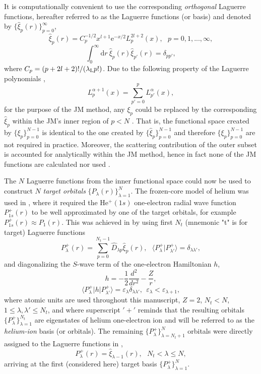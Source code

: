 \documentclass[aip
, pra
, showpacs
, aps
, twocolumn
, groupedaddress
, floatfix
]{revtex4}
\newcommand{\beq}{\begin{equation}}
\newcommand{\eeq}{\end{equation}}
\begin{document}
It is computationally convenient to use the corresponding {\em orthogonal} Laguerre functions,
hereafter referred to as the Laguerre functions (or basis) and denoted by $\{\hat{\xi}_p(r)\}_{p=0}^\infty$,
\[
\hat{\xi}_p(r) = C_p^{-1/2} x^{l+1} \mbox{e}^{-x /2}
L_p^{2l+2}(x), \ \ \ p = 0, 1, ..., \infty,
\]
\[
\int_0^{\infty} \mbox{d}r \ \hat{\xi}_p(r) \hat{\xi}_{p'}(r)=\delta_{pp'},
\]
where $C_p=(p+2l+2)!/(\lambda_{\rm L} p!)$.
Due to the following property of the Laguerre polynomials \cite{abramowitz},
\[
L_p^{\alpha + 1}(x)=\sum_{p'=0}^{p}L_{p'}^{\alpha}(x),
\]
for the purpose of the JM method, any $\xi_p$ could be replaced by the corresponding $\hat{\xi}_p$
within the JM's inner region of $p < N$ \cite{KB10p022708, KFB11}.
That is, the functional space created by $\{\xi_p\}_{p=0}^{N-1}$ is identical
to the one created by $\{\hat{\xi}_p\}_{p=0}^{N-1}$ and therefore $\{\xi_p\}_{p=0}^{N-1}$ are not required
in practice. Moreover, the scattering contribution of the outer subset is accounted for analytically within the JM method,
hence in fact none of the JM functions are calculated nor used \cite{KB10p022708, KFB11}.


The $N$  Laguerre functions from the inner functional space could now be used to construct $N$ {\em target orbitals}
$\{P_\lambda(r)\}_{\lambda=1}^{N}$.
The frozen-core model of helium was used in \cite{KFB11}, where it required the He$^+(1s)$ one-electron radial wave function
$P^+_{1s}(r)$ to be well approximated by one of the target orbitals, for example $P^+_{1s}(r) \approx P_1(r)$.
This was achieved in \cite{KFB11} by using first $N_t$ (mnemonic "t" is for target) Laguerre functions
\beq
P^+_\lambda(r)=\sum_{p=0}^{N_t-1} \hat{D}_{\lambda p} \hat{\xi}_p(r),
\ \ \ \langle P^+_\lambda|P^+_{\lambda'}\rangle=\delta_{\lambda\lambda'},
\label{P_ion_sum} \eeq
and diagonalizing the $S$-wave term of the one-electron Hamiltonian $h$,
\beq
h = -\frac{1}{2} \frac{d^2} {dr^2} - \frac{Z}{r},
\label{h}
\eeq
\beq
\langle P_\lambda^+|h|P^+_{\lambda'}\rangle=\varepsilon_\lambda \delta_{\lambda \lambda'},
\ \ \varepsilon_\lambda < \varepsilon_{\lambda+1},
\label{P_h_P}
\eeq
where atomic units are used throughout this manuscript,
$Z=2$, $N_t<N$, $1 \leq \lambda,\lambda' \leq N_t$,
and where superscript $'+'$ reminds that the resulting orbitals $\{P^+_\lambda\}_{\lambda=1}^{N_t}$ are eigenstates of helium one-electron ion and will be referred to as the {\em helium-ion} basis (or orbitals).
The remaining $\{P^+_\lambda\}_{\lambda=N_t+1}^{N}$ orbitals were directly assigned to the Laguerre functions in \cite{KFB11},
\beq
P^+_\lambda(r)= \hat{\xi}_{\lambda-1}(r),  \ \ \ N_t < \lambda \leq N,
\label{P_ion_N} \eeq
arriving at the first (considered here) target basis $\{P^+_\lambda\}_{\lambda=1}^{N}$.
\end{document}

